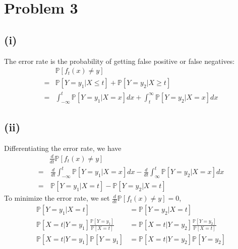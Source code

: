 \documentclass[twoside,11pt]{homework}
\begin{document}
\section*{Problem 3} 
\subsection*{(i)}
	The error rate is the probability of getting false positive or false negatives:
	\begin{align*}
		& \mathbb{P}[f_t(x)\neq y] \\
		=& \mathbb{P}[Y=y_1 | X\leq t] + \mathbb{P}[Y=y_2 | X\geq t] \\
		=& \int_{-\infty}^t  \mathbb{P}[Y=y_1 | X=x] dx + \int_{t}^\infty  \mathbb{P}[Y=y_2 | X=x] dx
	\end{align*}
\subsection*{(ii)}
	Differentiating the error rate, we have
	\begin{align*}
		& \frac{d}{dt} \mathbb{P}[f_t(x)\neq y]  \\
		=& \, \frac{d}{dt}\int_{-\infty}^t  \mathbb{P}[Y=y_1 | X=x] dx - \frac{d}{dt} \int_{\infty}^t  \mathbb{P}[Y=y_2 | X=x] dx \\
		=&\,  \mathbb{P}[Y=y_1 | X=t] - \mathbb{P}[Y=y_2 | X=t] \tag{Foundamental Theorem of Calculus}
	\end{align*}
	To minimize the error rate, we set $\frac{d}{dt} \mathbb{P}[f_t(x)\neq y] = 0$,
	\begin{align*}
		\mathbb{P}[Y=y_1 | X=t] &= \mathbb{P}[Y=y_2 | X=t] \\
		\mathbb{P}[ X=t | Y=y_1 ] \frac{ \mathbb{P}[ Y=y_1 ]}{ \mathbb{P}[ X=t]}
		&= \mathbb{P}[ X=t | Y=y_2 ] \frac{ \mathbb{P}[ Y=y_2 ]}{ \mathbb{P}[ X=t]} \tag{Bayes Rule}\\
		\mathbb{P}[ X=t | Y=y_1 ] \mathbb{P}[ Y=y_1 ] 
		&= \mathbb{P}[ X=t | Y=y_2 ] \mathbb{P}[ Y=y_2 ]
	\end{align*}
\end{document}
